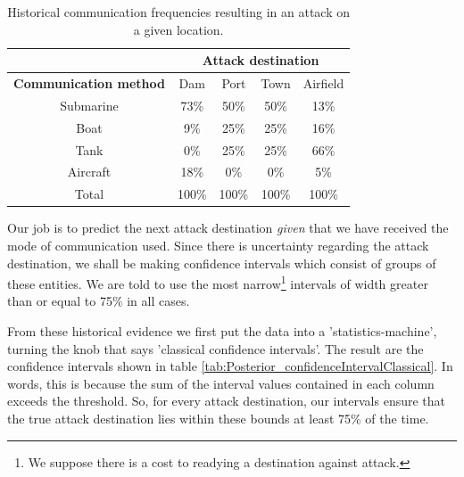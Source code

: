 \documentclass[11pt,fullpage]{book}
\begin{document}
\begin{table}[htbp]
  \centering
    \begin{tabular}{ccccc}
    \toprule
          & \multicolumn{4}{c}{\textbf{Attack destination}} \\
    \midrule
    \textbf{Communication method} & Dam & Port & Town & Airfield \\
    Submarine & 73\%  & 50\%  & 50\%  & 13\% \\
    Boat  & 9\%   & 25\%  & 25\%  & 16\% \\
    Tank  & 0\%   & 25\%  & 25\%  & 66\% \\
    Aircraft & 18\%   & 0\%  & 0\%   & 5\% \\
    \bottomrule
    Total & 100\% & 100\% & 100\% & 100\% \\
    \end{tabular}%
  \caption{Historical communication frequencies resulting in an attack on a given location.}\label{tab:Posterior_confidenceIntervalHistoric}
\end{table}%

Our job is to predict the next attack destination \textit{given} that we have received the mode of communication used. Since there is uncertainty regarding the attack destination, we shall be making confidence intervals which consist of groups of these entities. We are told to use the most narrow\footnote{We suppose there is a cost to readying a destination against attack.} intervals of width greater than or equal to 75\% in all cases.

From these historical evidence we first put the data into a 'statistics-machine', turning the knob that says 'classical confidence intervals'. The result are the confidence intervals shown in table \ref{tab:Posterior_confidenceIntervalClassical}. In words, this is because the sum of the interval values contained in each column exceeds the threshold. So, for every attack destination, our intervals ensure that the true attack destination lies within these bounds at least 75\% of the time.
\end{document}

